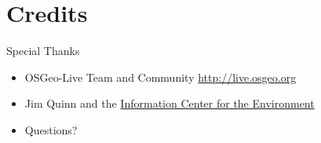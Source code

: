 \documentclass{beamer}
\begin{document}
\section{Credits}
\begin{frame}{Special Thanks}
	\begin{itemize}
		\item OSGeo-Live Team and Community \url{http://live.osgeo.org}
		\item Jim Quinn and the \href{http://ice.ucdavis.edu}{Information Center for the Environment}
		\item Questions?
		\begin{center}
		\end{center}
	\end{itemize}
\end{frame}


\end{document}
